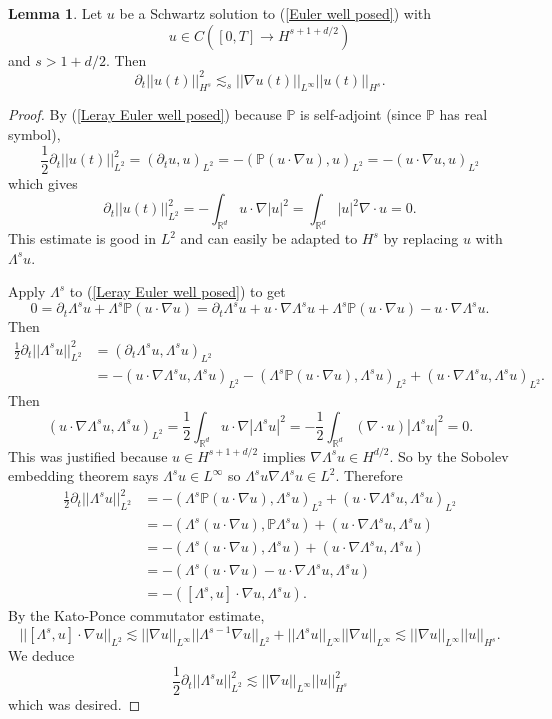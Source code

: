 \documentclass[12pt]{book}
\newcommand{\RR}{\mathbb{R}}
\newcommand{\PP}{\mathbb{P}}
\theoremstyle{definition}
\newtheorem{lemma}[theorem]{Lemma}
\begin{document}
\begin{lemma}
Let $u$ be a Schwartz solution to (\ref{Euler well posed}) with
$$u \in C([0, T] \to H^{s+1+d/2})$$
and $s > 1 + d/2$.
Then
$$\partial_t ||u(t)||_{H^s}^2 \lesssim_s ||\nabla u(t)||_{L^\infty} ||u(t)||_{H^s}.$$
\end{lemma}
\begin{proof}
By (\ref{Leray Euler well posed}) because $\PP$ is self-adjoint (since $\PP$ has real symbol),
$$\frac{1}{2}\partial_t ||u(t)||_{L^2}^2 = (\partial_t u, u)_{L^2} = -(\PP(u \cdot \nabla u), u)_{L^2} = -(u \cdot \nabla u, u)_{L^2}$$
which gives
$$\partial_t ||u(t)||_{L^2}^2 = -\int_{\RR^d} u \cdot \nabla |u|^2 = \int_{\RR^d}|u|^2 \nabla \cdot u = 0.$$
This estimate is good in $L^2$ and can easily be adapted to $H^s$ by replacing $u$ with $\Lambda^su$.

Apply $\Lambda^s$ to (\ref{Leray Euler well posed}) to get
$$0 = \partial_t \Lambda^s u + \Lambda^s \PP(u \cdot \nabla u) = \partial_t \Lambda^s u + u \cdot \nabla \Lambda^s u + \Lambda^s \PP(u \cdot \nabla u) - u \cdot \nabla \Lambda^s u.$$
Then
\begin{align*}
\frac{1}{2} \partial_t ||\Lambda^s u||_{L^2}^2 &= (\partial_t \Lambda^s u, \Lambda^s u)_{L^2}\\
&= -(u\cdot \nabla \Lambda^s u, \Lambda^s u)_{L^2} - (\Lambda^s \PP(u \cdot \nabla u), \Lambda^s u)_{L^2} + (u \cdot \nabla \Lambda^s u, \Lambda^s u)_{L^2}.
\end{align*}
Then
$$(u\cdot \nabla \Lambda^s u, \Lambda^s u)_{L^2} = \frac{1}{2}\int_{\RR^d} u \cdot \nabla |\Lambda^s u|^2 = -\frac{1}{2}\int_{\RR^d} (\nabla \cdot u) |\Lambda^s u|^2 = 0.$$
This was justified because $u \in H^{s+1+d/2}$ implies $\nabla \Lambda^s u \in H^{d/2}$.
So by the Sobolev embedding theorem says $\Lambda^s u \in L^\infty$ so $\Lambda^s u \nabla \Lambda^s u \in L^2$.
Therefore
\begin{align*}\frac{1}{2} \partial_t ||\Lambda^s u||_{L^2}^2 &= - (\Lambda^s \PP(u \cdot \nabla u), \Lambda^s u)_{L^2} + (u \cdot \nabla \Lambda^s u, \Lambda^s u)_{L^2}\\
&= -(\Lambda^s(u \cdot \nabla u), \PP \Lambda^s u) + (u \cdot \nabla \Lambda^s u, \Lambda^s u)\\
&= -(\Lambda^s(u \cdot \nabla u), \Lambda^s u) + (u \cdot \nabla \Lambda^s u, \Lambda^s u)\\
&= -(\Lambda^s(u \cdot \nabla u) - u \cdot \nabla \Lambda^s u, \Lambda^s u)\\
&= -([\Lambda^s, u] \cdot \nabla u, \Lambda^s u).
\end{align*}
By the Kato-Ponce commutator estimate,
$$||[\Lambda^s, u] \cdot \nabla u||_{L^2} \lesssim ||\nabla u||_{L^\infty} ||\Lambda^{s-1} \nabla u||_{L^2} + ||\Lambda^s u||_{L^\infty} ||\nabla u||_{L^\infty} \lesssim ||\nabla u||_{L^\infty} ||u||_{H^s}.$$
We deduce
$$\frac{1}{2} \partial_t ||\Lambda^s u||_{L^2}^2 \lesssim ||\nabla u||_{L^\infty} ||u||_{H^s}^2$$
which was desired.
\end{proof}
\end{document}
